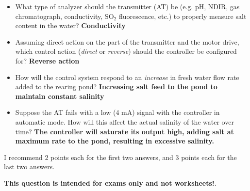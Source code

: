 \begin{itemize}
\item{} What type of analyzer should the transmitter (AT) be (e.g. pH, NDIR, gas chromatograph, conductivity, SO$_{2}$ fluorescence, etc.) to properly measure salt content in the water?  {\bf Conductivity}
\vskip 10pt
\item{} Assuming direct action on the part of the transmitter and the motor drive, which control action ({\it direct} or {\it reverse}) should the controller be configured for?  {\bf Reverse action}
\vskip 10pt
\item{} How will the control system respond to an {\it increase} in fresh water flow rate added to the rearing pond?  {\bf Increasing salt feed to the pond to maintain constant salinity}
\vskip 10pt
\item{} Suppose the AT fails with a low (4 mA) signal with the controller in automatic mode.  How will this affect the actual salinity of the water over time?  {\bf The controller will saturate its output high, adding salt at maximum rate to the pond, resulting in excessive salinity.}
\end{itemize}

I recommend 2 points each for the first two answers, and 3 points each for the last two answers.







{\bf This question is intended for exams only and not worksheets!}.



